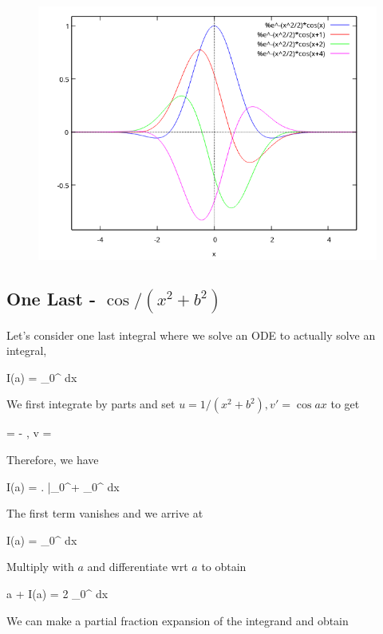 \begin{figure}[H]
    \includegraphics[scale=0.7]{images/2022-03-21_plot_4.png}
\end{figure}

\subsection{One Last - $\cos / (x^2+b^2)$}

Let's consider one last integral where we solve an ODE to actually solve an integral,

\bee
I(a) = \int_0^\infty {} dx
\eee

We first integrate by parts and set $u = 1/(x^2+b^2), v' = \cos ax$ to get

\bee
{} = - , v = 
\eee

Therefore, we have

\bee
I(a) = \left.  \right|_0^\infty +  \int_0^\infty {} dx
\eee

The first term vanishes and we arrive at

\be\label{2022-03-21:eq3}
I(a) =  \int_0^\infty {} dx
\ee

Multiply with $a$ and differentiate wrt $a$ to obtain

\bee
a  + I(a) = 2 \int_0^\infty {} dx
\eee

We can make a partial fraction expansion of the integrand and obtain

